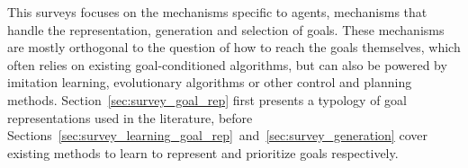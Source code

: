  This surveys focuses on the mechanisms specific to \rlimgep agents, \ie mechanisms that handle the representation, generation and selection of goals. These mechanisms are mostly orthogonal to the question of how to reach the goals themselves, which often relies on existing goal-conditioned algorithms, but can also be powered by imitation learning, evolutionary algorithms or other control and planning methods. Section~\ref{sec:survey_goal_rep} first presents a typology of goal representations used in the literature, before Sections~\ref{sec:survey_learning_goal_rep}~and~\ref{sec:survey_generation} cover existing methods to learn to represent and prioritize goals respectively.




